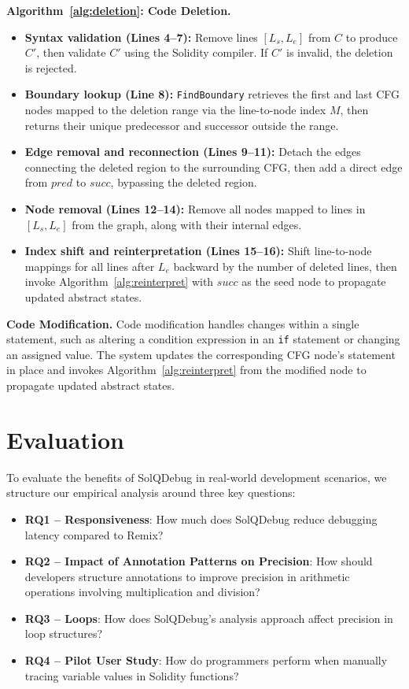 \documentclass[pdflatex,sn-basic]{sn-jnl}%
\theoremstyle{thmstyleone}%
\theoremstyle{thmstyletwo}%
\theoremstyle{thmstylethree}%
\begin{document}
\noindent\textbf{Algorithm~\ref{alg:deletion}: Code Deletion.}
\begin{itemize}
  \item \textbf{Syntax validation (Lines 4--7):} Remove lines $[L_s, L_e]$ from $C$ to produce $C'$,
        then validate $C'$ using the Solidity compiler. If $C'$ is invalid, the deletion is rejected.
  \item \textbf{Boundary lookup (Line 8):} \texttt{FindBoundary} retrieves the first and last CFG nodes mapped to the deletion range
        via the line-to-node index $M$, then returns their unique predecessor and successor
        outside the range.
  \item \textbf{Edge removal and reconnection (Lines 9--11):} Detach the edges connecting the deleted region to the surrounding CFG,
        then add a direct edge from $pred$ to $succ$, bypassing the deleted region.
  \item \textbf{Node removal (Lines 12--14):} Remove all nodes mapped to lines in $[L_s, L_e]$ from the graph,
        along with their internal edges.
  \item \textbf{Index shift and reinterpretation (Lines 15--16):} Shift line-to-node mappings for all lines after $L_e$ backward by the number of deleted lines, then invoke Algorithm~\ref{alg:reinterpret} with $succ$ as the seed node to propagate updated abstract states.
\end{itemize}

\noindent\textbf{Code Modification.}
Code modification handles changes within a single statement,
such as altering a condition expression in an \texttt{if} statement or changing an assigned value.
The system updates the corresponding CFG node's statement in place and invokes
Algorithm~\ref{alg:reinterpret} from the modified node to propagate updated abstract states.

\FloatBarrier

\section{Evaluation}
To evaluate the benefits of SolQDebug in real-world development scenarios,
we structure our empirical analysis around three key questions:

\begin{itemize}
  \item \textbf{RQ1 -- Responsiveness}:\;%
        How much does SolQDebug reduce debugging latency compared to Remix?
  \item \textbf{RQ2 -- Impact of Annotation Patterns on Precision}:\;%
        How should developers structure annotations to improve precision in
        arithmetic operations involving multiplication and division?
  \item \textbf{RQ3 -- Loops}:\;%
        How does SolQDebug's analysis approach affect precision in loop structures?
  \item \textbf{RQ4 -- Pilot User Study}:\;%
        How do programmers perform when manually tracing variable values in Solidity functions?
\end{itemize}
\end{document}

